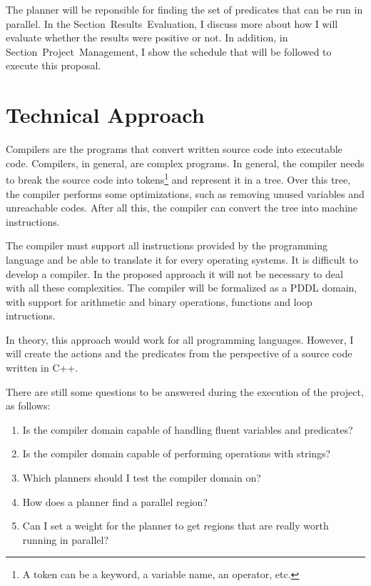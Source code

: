 \documentclass[letterpaper]{article}
\begin{document}
The planner will be reponsible for finding the set of predicates that can be run in parallel. In the Section~Results~Evaluation, I discuss more about how I will evaluate whether the results were positive or not. In addition, in Section~Project~Management, I show the schedule that will be followed to execute this proposal.


\section{Technical Approach}

Compilers are the programs that convert written source code into executable code. Compilers, in general, are complex programs. In general, the compiler needs to break the source code into tokens\footnote{A token can be a keyword, a variable name, an operator, etc.} and represent it in a tree. Over this tree, the compiler performs some optimizations, such as removing unused variables and unreachable codes. After all this, the compiler can convert the tree into machine instructions.

The compiler must support all instructions provided by the programming language and be able to translate it for every operating systems. It is difficult to develop a compiler. In the proposed approach it will not be necessary to deal with all these complexities. The compiler will be formalized as a PDDL domain, with support for arithmetic and binary operations, functions and loop intructions.

In theory, this approach would work for all programming languages. However, I will create the actions and the predicates from the perspective of a source code written in C++.

There are still some questions to be answered during the execution of the project, as follows:

\begin{enumerate}
  \item Is the compiler domain capable of handling fluent variables and predicates?
  \item Is the compiler domain capable of performing operations with strings?
  \item Which planners should I test the compiler domain on?
  \item How does a planner find a parallel region?
  \item Can I set a weight for the planner to get regions that are really worth running in parallel?
\end{enumerate}
\end{document}

